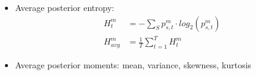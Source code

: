 \documentclass{beamer}
\begin{document}
\begin{frame}
{\begin{minipage}[t]{0.45\textwidth}
    \begin{itemize}
      \item Average posterior entropy:
      {\footnotesize
      \begin{align*}
        H^m_t &= - \sum_{S} p^m_{s,t}  \cdot log_2 \left( p^m_{s,t} \right) \\
        H^m_{avg} &= \frac{1}{T} \sum_{t=1}^{T} H^m_t 
      \end{align*}
      }
      \item Average posterior moments: mean, variance, skewness, kurtosis
    \end{itemize}  

  \end{minipage}
  }
  
\end{frame}



\end{document}
